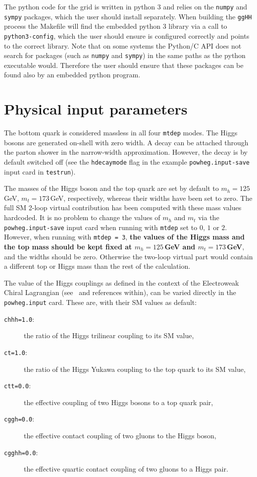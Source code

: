 \documentclass[paper]{JHEP3}
\begin{document}
The python code for the grid is written in python 3 and relies on the {\tt numpy} and {\tt sympy} packages, which 
the user should install separately. When building the {\tt ggHH} process the Makefile will find the embedded python 3 library
via a call to {\tt python3-config}, which the user should ensure is configured correctly and points to the correct library.
Note that on some systems the Python/C API does not search for packages (such as {\tt numpy} and {\tt sympy}) in the same 
paths as the python executable would. Therefore the user should ensure that these packages can be found also by an embedded python program.

\section{Physical input parameters}

The bottom quark is considered massless in all four {\tt mtdep} modes. The Higgs
bosons are generated on-shell with zero width. A decay can be attached
through the parton shower in the narrow-width approximation. However,
the decay is by default switched off (see the {\tt hdecaymode} flag in the
example {\tt powheg.input-save} input card in {\tt testrun}).

The masses of the Higgs boson and the top quark are set by default to
$m_h=125$\,GeV, $m_t=173$\,GeV, respectively, whereas their widths
have been set to zero. The full SM 2-loop virtual contribution has
been computed with these mass values hardcoded. 
It is no problem to change the values of $m_h$
and $m_t$ via the {\tt powheg.input-save} input card when running with
{\tt mtdep} set to $0$, $1$ or $2$.
However, when running with {\tt mtdep = 3}, 
 {\bf the values of the Higgs mass and
the top mass should be kept fixed at $m_h=125$\,GeV and $m_t=173$\,GeV}, and the widths should be zero.
Otherwise the two-loop virtual part would contain a different top or Higgs mass than the rest of the calculation.

The value of the Higgs couplings as defined in the context of the Electroweak Chiral Lagrangian (see~\cite{Buchalla:2018yce} and references within), can be varied directly in the {\tt powheg.input} card. These are, with their SM values as default:

\begin{description}
\item[{\tt chhh=1.0}:] { the ratio of the Higgs trilinear coupling to its SM value,}
\item[{\tt ct=1.0}:] { the ratio of the Higgs Yukawa coupling to the top quark to its SM value,}
\item[{\tt ctt=0.0}:] { the effective coupling of two Higgs bosons to a top quark pair,}
\item[{\tt cggh=0.0}:] { the effective contact coupling of two gluons to the Higgs boson,}
\item[{\tt cgghh=0.0}:] { the effective quartic contact coupling of two gluons to a Higgs pair.}
\end{description}
\end{document}
